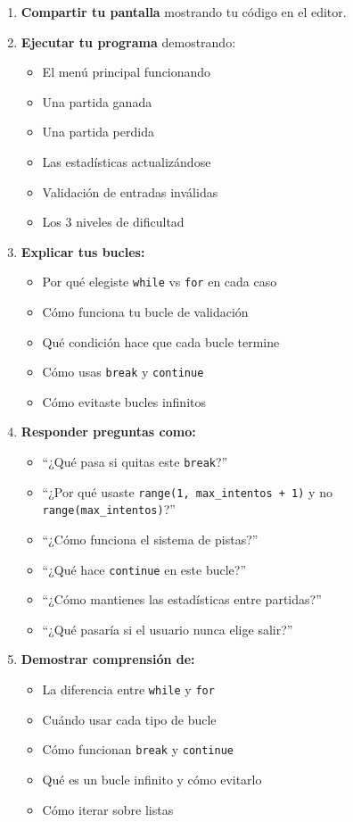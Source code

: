 \documentclass[12pt,a4paper]{article}
\begin{document}
\begin{enumerate}[leftmargin=*]
    \item \textbf{Compartir tu pantalla} mostrando tu código en el editor.
    
    \item \textbf{Ejecutar tu programa} demostrando:
    \begin{itemize}
        \item El menú principal funcionando
        \item Una partida ganada
        \item Una partida perdida
        \item Las estadísticas actualizándose
        \item Validación de entradas inválidas
        \item Los 3 niveles de dificultad
    \end{itemize}
    
    \item \textbf{Explicar tus bucles:}
    \begin{itemize}
        \item Por qué elegiste \texttt{while} vs \texttt{for} en cada caso
        \item Cómo funciona tu bucle de validación
        \item Qué condición hace que cada bucle termine
        \item Cómo usas \texttt{break} y \texttt{continue}
        \item Cómo evitaste bucles infinitos
    \end{itemize}
    
    \item \textbf{Responder preguntas como:}
    \begin{itemize}
        \item ``¿Qué pasa si quitas este \texttt{break}?''
        \item ``¿Por qué usaste \texttt{range(1, max\_intentos + 1)} y no \texttt{range(max\_intentos)}?''
        \item ``¿Cómo funciona el sistema de pistas?''
        \item ``¿Qué hace \texttt{continue} en este bucle?''
        \item ``¿Cómo mantienes las estadísticas entre partidas?''
        \item ``¿Qué pasaría si el usuario nunca elige salir?''
    \end{itemize}
    
    \item \textbf{Demostrar comprensión de:}
    \begin{itemize}
        \item La diferencia entre \texttt{while} y \texttt{for}
        \item Cuándo usar cada tipo de bucle
        \item Cómo funcionan \texttt{break} y \texttt{continue}
        \item Qué es un bucle infinito y cómo evitarlo
        \item Cómo iterar sobre listas
    \end{itemize}
\end{enumerate}
\end{document}
